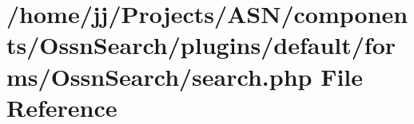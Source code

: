 \hypertarget{components_2_ossn_search_2plugins_2default_2forms_2_ossn_search_2search_8php}{}\section{/home/jj/\+Projects/\+A\+S\+N/components/\+Ossn\+Search/plugins/default/forms/\+Ossn\+Search/search.php File Reference}
\label{components_2_ossn_search_2plugins_2default_2forms_2_ossn_search_2search_8php}
